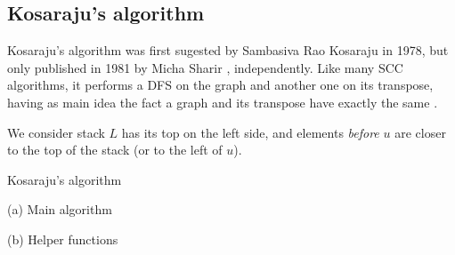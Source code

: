 \subsection{Kosaraju's algorithm} \label{algorithm-scc-kosaraju}
Kosaraju's algorithm was first sugested by Sambasiva Rao Kosaraju in 1978, but only published in 1981 by Micha Sharir \cite{sharir81}, independently. Like many \acrshort{SCC} algorithms, it performs a \acrshort{DFS} on the graph and another one on its transpose, having as main idea the fact a graph and its transpose have exactly the same .\par
We consider stack $L$ has its top on the left side, and elements \emph{before} $u$ are closer to the top of the stack (or to the left of $u$).
\begin{algorithm}
    \caption{Kosaraju's algorithm}
    \label{alg-kosaraju}
    \begin{minipage}[t]{0.49\textwidth}
        (a) Main algorithm
        \begin{algorithmic}[1]
             {}
            \EndFor
                \State {}
            \EndWhile
            \State {}
            \EndFunction
        \end{algorithmic}
    \end{minipage}
    \begin{minipage}[t]{0.49\textwidth}
        (b) Helper functions
        \begin{algorithmic}[1]
                 {\Return{}}
                \EndIf
                 {}
                \EndFor
            \EndFunction


                 {\Return{}}
                \EndIf
                 {}
                \EndFor
            \EndFunction
        \end{algorithmic}
    \end{minipage}
\end{algorithm}
